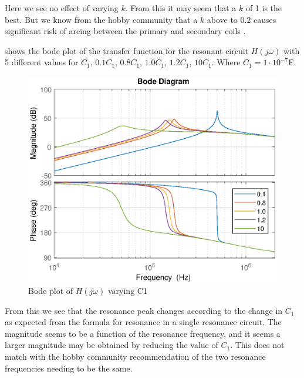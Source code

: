 Here we see no effect of varying $k$. From this it may seem that a $k$ of 1 is the best. But we know from the hobby community that a $k$ above to 0.2 causes significant risk of arcing between the primary and secondary coils \citep{scantesla} \citep{loneoceans} \citep{conner} \citep{easternvoltage} \citep{terrel} \citep{chunkyboy86}.

\newpage
{} shows the bode plot of the transfer function for the resonant circuit $H(j\omega)$ with 5 different values for $C_1$, $0.1C_1$, $0.8C_1$, $1.0C_1$, $1.2C_1$, $10C_1$. Where $C_1 = 1 \cdot 10^{-7}$F.

\begin{figure}[H]
    \centering
    \includegraphics[width=\textwidth]{img/CoilRigBode_C1.eps}
    \caption{Bode plot of $H(j\omega)$ varying C1}
    \label{fig:bode_c1}
\end{figure}

From this we see that the resonance peak changes according to the change in $C_1$ as expected from the formula for resonance in a single resonance circuit. The magnitude seems to be a function of the resonance frequency, and it seems a larger magnitude may be obtained by reducing the value of $C_1$. This does not match with the hobby community recommendation of the two resonance frequencies needing to be the same.

